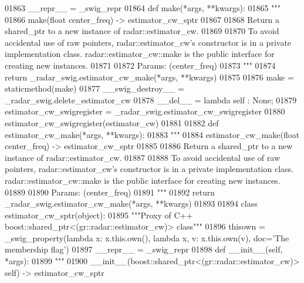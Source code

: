 \begin{DoxyCode}
{{{{{{{{01863     \_\_repr\_\_ = \_swig\_repr
01864     \textcolor{keyword}{def }make(*args, **kwargs):
01865         \textcolor{stringliteral}{"""}
01866 \textcolor{stringliteral}{        make(float center\_freq) -> estimator\_cw\_sptr}
01867 \textcolor{stringliteral}{}
01868 \textcolor{stringliteral}{        Return a shared\_ptr to a new instance of radar::estimator\_cw.}
01869 \textcolor{stringliteral}{}
01870 \textcolor{stringliteral}{        To avoid accidental use of raw pointers, radar::estimator\_cw's constructor is in a private
       implementation class. radar::estimator\_cw::make is the public interface for creating new instances.}
01871 \textcolor{stringliteral}{}
01872 \textcolor{stringliteral}{        Params: (center\_freq)}
01873 \textcolor{stringliteral}{        """}
01874         \textcolor{keywordflow}{return} \_radar\_swig.estimator\_cw\_make(*args, **kwargs)
01875 
01876     make = staticmethod(make)
01877     \_\_swig\_destroy\_\_ = \_radar\_swig.delete\_estimator\_cw
01878     \_\_del\_\_ = \textcolor{keyword}{lambda} self : \textcolor{keywordtype}{None};
01879 estimator\_cw\_swigregister = \_radar\_swig.estimator\_cw\_swigregister
01880 estimator_cw_swigregister(estimator\_cw)
01881 
01882 \textcolor{keyword}{def }estimator_cw_make(*args, **kwargs):
01883   \textcolor{stringliteral}{"""}
01884 \textcolor{stringliteral}{    estimator\_cw\_make(float center\_freq) -> estimator\_cw\_sptr}
01885 \textcolor{stringliteral}{}
01886 \textcolor{stringliteral}{    Return a shared\_ptr to a new instance of radar::estimator\_cw.}
01887 \textcolor{stringliteral}{}
01888 \textcolor{stringliteral}{    To avoid accidental use of raw pointers, radar::estimator\_cw's constructor is in a private
       implementation class. radar::estimator\_cw::make is the public interface for creating new instances.}
01889 \textcolor{stringliteral}{}
01890 \textcolor{stringliteral}{    Params: (center\_freq)}
01891 \textcolor{stringliteral}{    """}
01892   \textcolor{keywordflow}{return} \_radar\_swig.estimator\_cw\_make(*args, **kwargs)
01893 
01894 \textcolor{keyword}{class }estimator_cw_sptr(object):
01895     \textcolor{stringliteral}{"""Proxy of C++ boost::shared\_ptr<(gr::radar::estimator\_cw)> class"""}
01896     thisown = _swig_property(\textcolor{keyword}{lambda} x: x.this.own(), \textcolor{keyword}{lambda} x, v: x.this.own(v), doc=\textcolor{stringliteral}{'The membership flag'})
01897     \_\_repr\_\_ = \_swig\_repr
01898     \textcolor{keyword}{def }__init__(self, *args): 
01899         \textcolor{stringliteral}{"""}
01900 \textcolor{stringliteral}{        \_\_init\_\_(boost::shared\_ptr<(gr::radar::estimator\_cw)> self) -> estimator\_cw\_sptr}
}}}}}}}}
\end{DoxyCode}
